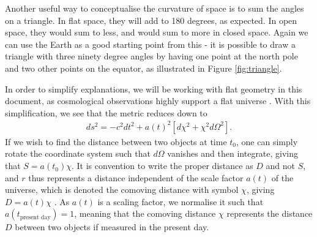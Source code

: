 \documentclass[titlesmallcaps, examinerscopy, copyrightpage]{uqthesis}
\begin{document}
Another useful way to conceptualise the curvature of space is to sum the angles on a triangle. In flat space, they will add to 180 degrees, as expected. In open space, they would sum to less, and would sum to more in closed space. Again we can use the Earth as a good starting point from this - it is possible to draw a triangle with three ninety degree angles by having one point at the north pole and two other points on the equator, as illustrated in Figure \ref{fig:triangle}. 

In order to simplify explanations, we will be working with flat geometry in this document, as cosmological observations highly support a flat universe \citep{Planck201416, DavisMortsell2007,Mortonson2009}. With this simplification, we see that the metric reduces down to
\begin{align} \label{eq:flatmetric}
ds^2 = -c^2 dt^2 + a(t)^2 \left[ d\chi^2 + \chi^2 d\Omega^2 \right].
\end{align}
If we wish to find the distance between two objects at time $t_0$, one can simply rotate the coordinate system such that $d\Omega$ vanishes and then integrate, giving that $S = a(t_0) \chi$. It is convention to write the proper distance as $D$ and not $S$, and $r$ thus represents a distance independent of the scale factor $a(t)$ of the universe, which is denoted the comoving distance with symbol $\chi$, giving $D = a(t) \chi$ \citep{CarrollOstlie2006}.  As $a(t)$ is a scaling factor, we normalise it such that $a(t_{\text{present day}}) = 1$, meaning that the comoving distance $\chi$ represents the distance $D$ between two objects if measured in the present day.
\end{document}
